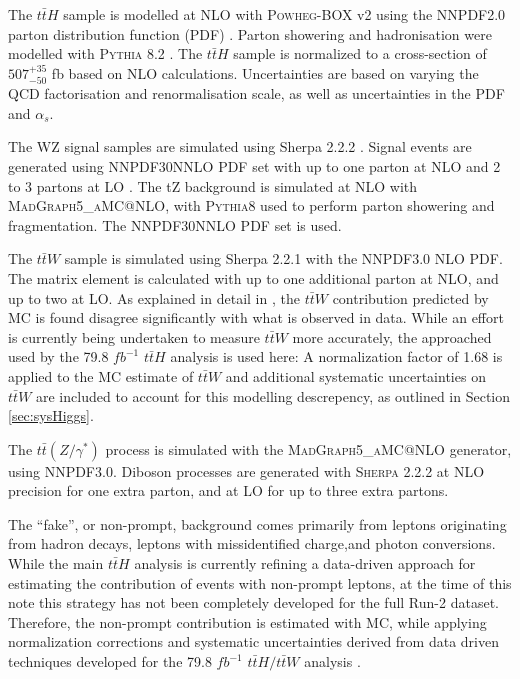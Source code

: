The $t\bar{t}H$ sample is modelled at NLO with \textsc{Powheg-BOX} v2 using the NNPDF2.0 parton distribution function (PDF) \cite{ATL-PHYS-PUB-2015-011}. Parton showering and hadronisation were modelled with \textsc{Pythia} 8.2 \cite{ATL-PHYS-PUB-2011-009}. The $t\bar{t}H$ sample is normalized to a cross-section of $507^{+35}_{-50}$ fb based on NLO calculations. Uncertainties are based on varying the QCD factorisation and renormalisation scale, as well as uncertainties in the PDF and $\alpha_s$.

The WZ signal samples are simulated using Sherpa 2.2.2 \cite{sherpa}. Signal events are generated using NNPDF30NNLO PDF set with up to one parton at NLO and 2 to 3 partons at LO \cite{Ball:2014uwa}. The tZ background is simulated at NLO with \textsc{MadGraph5\_aMC@NLO}, with \textsc{Pythia8} used to perform parton showering and fragmentation. The NNPDF30NNLO PDF set is used.

The $t\bar{t}W$ sample is simulated using Sherpa 2.2.1 with the NNPDF3.0 NLO PDF. The matrix element is calculated with up to one additional parton at NLO, and up to two at LO. As explained in detail in \cite{ttH_paper}, the $t\bar{t}W$ contribution predicted by MC is found disagree significantly with what is observed in data. While an effort is currently being undertaken to measure $t\bar{t}W$ more accurately, the approached used by the 79.8 $fb^{-1}$ $t\bar{t}H$ analysis is used here: A normalization factor of 1.68 is applied to the MC estimate of $t\bar{t}W$ and additional systematic uncertainties on $t\bar{t}W$ are included to account for this modelling descrepency, as outlined in Section \ref{sec:sysHiggs}.

The $t\bar{t}(Z/\gamma^*)$ process is simulated with the \textsc{MadGraph5\_aMC@NLO} generator, using NNPDF3.0. Diboson processes are generated with \textsc{Sherpa} 2.2.2 at NLO precision for one extra parton, and at LO for up to three extra partons.

The ``fake'', or non-prompt, background comes primarily from leptons originating from hadron decays, leptons with missidentified charge,and photon conversions. While the main $t\bar{t}H$ analysis is currently refining a data-driven approach for estimating the contribution of events with non-prompt leptons, at the time of this note this strategy has not been completely developed for the full Run-2 dataset. Therefore, the non-prompt contribution is estimated with MC, while applying normalization corrections and systematic uncertainties derived from data driven techniques developed for the 79.8 $fb^{-1}$ $t\bar{t}H/t\bar{t}W$ analysis \cite{ttH_paper}. 

